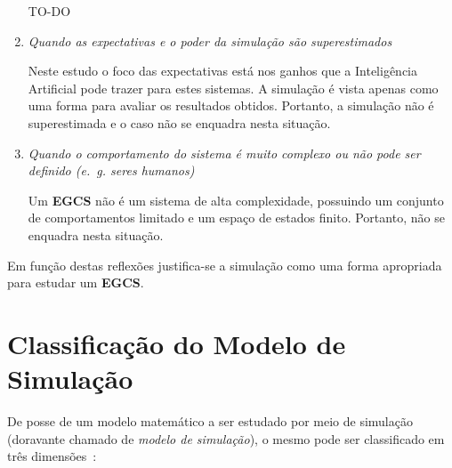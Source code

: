 \begin{enumerate}
TO-DO %

\item \textit{Quando as expectativas e o poder da simulação são superestimados}

Neste estudo o foco das expectativas está nos ganhos que a Inteligência
Artificial pode trazer para estes sistemas. A simulação é vista apenas como uma
forma para avaliar os resultados obtidos. Portanto, a simulação não é
superestimada e o caso não se enquadra nesta situação.

\item \textit{Quando o comportamento do sistema é muito complexo ou não pode ser
definido (e.~g. seres humanos)}

Um \textbf{EGCS} não é um sistema de alta complexidade, possuindo um conjunto de
comportamentos limitado e um espaço de estados finito. Portanto, não se enquadra
nesta situação.

\end{enumerate}

Em função destas reflexões justifica-se a simulação como uma forma apropriada
para estudar um \textbf{EGCS}.

\section{Classificação do Modelo de Simulação}

De posse de um modelo matemático a ser estudado por meio de simulação (doravante
chamado de \textit{modelo de simulação}), o mesmo pode ser classificado em três
dimensões~\cite{Banks,Law}:

